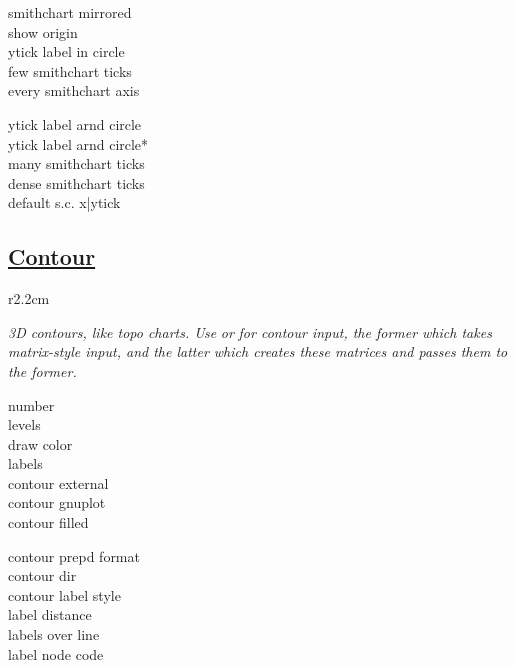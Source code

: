 {\color{blue}
\begin{minipage}[t]{3.0cm}
smithchart mirrored\\
show origin\\
ytick label in circle\\
few smithchart ticks\\
every smithchart axis
\end{minipage}
\begin{minipage}[t]{3.3cm}
ytick label ar\textquotesingle nd circle\\
ytick label ar\textquotesingle nd circle*\\
many smithchart ticks\\
dense smithchart ticks\\
default s.c. x|ytick
\end{minipage}}




\subsection*{\href{\docurl\#pgfp./pgfplots/contour:prepared}{Contour}}
\begin{wrapfigure}[5]{r}{2.2cm}
\vspace{-8mm}
\resizebox{2cm}{!}{}
\end{wrapfigure}

\textit{3D contours, like topo charts. Use }\href{\docurl\#pgfp./pgfplots/contour:prepared}{}\textit{ or }\href{\docurl\#pgfp./pgfplots/contour:gnuplot}{}\textit{ for contour input, the former which takes matrix-style input, and the latter which creates these matrices and passes them to the former.}

{\color{blue}
\begin{minipage}[t]{3.0cm}
number\\
levels\\
draw color\\
labels\\
contour external\\
contour gnuplot\\
contour filled
\end{minipage}
\begin{minipage}[t]{3.3cm}
contour prep\textquotesingle d format\\
contour dir\\
contour label style\\
label distance\\
labels over line\\
label node code\\
\end{minipage}}



